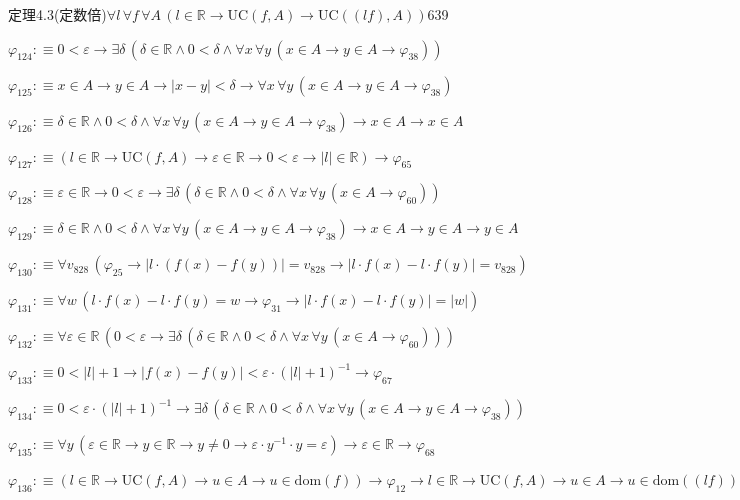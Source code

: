 \begin{fullproof}{定理4.3(定数倍)}{$\forall l\,\forall f\,\forall A\,(l \in \mathbb{R} \to \mathrm{UC}(f,A) \to \mathrm{UC}((l f),A))$}{639}
\begin{abbrevlist}
\item $\varphi_{124} :\equiv 0 < \varepsilon \to \exists \delta\,(\delta \in \mathbb{R} \land 0 < \delta \land \forall x\,\forall y\,(x \in A \to y \in A \to \varphi_{38}))$
\item $\varphi_{125} :\equiv x \in A \to y \in A \to \lvert x - y \rvert < \delta \to \forall x\,\forall y\,(x \in A \to y \in A \to \varphi_{38})$
\item $\varphi_{126} :\equiv \delta \in \mathbb{R} \land 0 < \delta \land \forall x\,\forall y\,(x \in A \to y \in A \to \varphi_{38}) \to x \in A \to x \in A$
\item $\varphi_{127} :\equiv (l \in \mathbb{R} \to \mathrm{UC}(f,A) \to \varepsilon \in \mathbb{R} \to 0 < \varepsilon \to \lvert l \rvert \in \mathbb{R}) \to \varphi_{65}$
\item $\varphi_{128} :\equiv \varepsilon \in \mathbb{R} \to 0 < \varepsilon \to \exists \delta\,(\delta \in \mathbb{R} \land 0 < \delta \land \forall x\,\forall y\,(x \in A \to \varphi_{60}))$
\item $\varphi_{129} :\equiv \delta \in \mathbb{R} \land 0 < \delta \land \forall x\,\forall y\,(x \in A \to y \in A \to \varphi_{38}) \to x \in A \to y \in A \to y \in A$
\item $\varphi_{130} :\equiv \forall v_{828}\,(\varphi_{25} \to \lvert l \cdot (f(x) - f(y)) \rvert = v_{828} \to \lvert l \cdot f(x) - l \cdot f(y) \rvert = v_{828})$
\item $\varphi_{131} :\equiv \forall w\,(l \cdot f(x) - l \cdot f(y) = w \to \varphi_{31} \to \lvert l \cdot f(x) - l \cdot f(y) \rvert = \lvert w \rvert)$
\item $\varphi_{132} :\equiv \forall \varepsilon \in \mathbb{R}\,(0 < \varepsilon \to \exists \delta\,(\delta \in \mathbb{R} \land 0 < \delta \land \forall x\,\forall y\,(x \in A \to \varphi_{60})))$
\item $\varphi_{133} :\equiv 0 < \lvert l \rvert + 1 \to \lvert f(x) - f(y) \rvert < \varepsilon \cdot (\lvert l \rvert + 1)^{-1} \to \varphi_{67}$
\item $\varphi_{134} :\equiv 0 < \varepsilon \cdot (\lvert l \rvert + 1)^{-1} \to \exists \delta\,(\delta \in \mathbb{R} \land 0 < \delta \land \forall x\,\forall y\,(x \in A \to y \in A \to \varphi_{38}))$
\item $\varphi_{135} :\equiv \forall y\,(\varepsilon \in \mathbb{R} \to y \in \mathbb{R} \to y \neq 0 \to \varepsilon \cdot y^{-1} \cdot y = \varepsilon) \to \varepsilon \in \mathbb{R} \to \varphi_{68}$
\item $\varphi_{136} :\equiv (l \in \mathbb{R} \to \mathrm{UC}(f,A) \to u \in A \to u \in \mathrm{dom}(f)) \to \varphi_{12} \to l \in \mathbb{R} \to \mathrm{UC}(f,A) \to u \in A \to u \in \mathrm{dom}((l f))$

\end{abbrevlist}
\end{fullproof}
